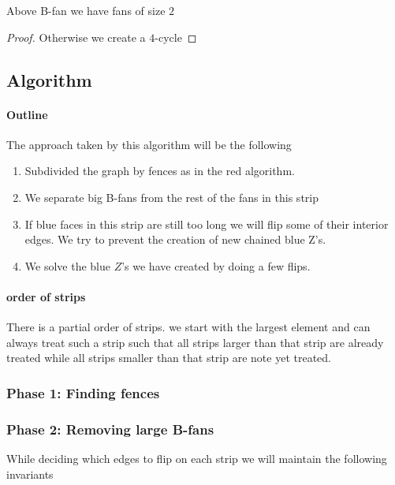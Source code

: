   \begin{lemma}
    \label{lm:}
    Above B-fan we have fans of size $2$
  \end{lemma}
  \begin{proof}
    Otherwise we create a $4$-cycle
  \end{proof}


\subsection{Algorithm}

\paragraph{Outline}
The approach taken by this algorithm will be the following
\begin{enumerate}
  \item Subdivided the graph by fences as in the red algorithm.
  \item We separate big B-fans from the rest of the fans in this strip
  \item If blue faces  in this strip are still too long we will flip some of their interior edges. We try to prevent the creation of new chained blue Z's.
  \item We solve the blue $Z$'s we have created by doing a few flips.
\end{enumerate}

\paragraph{order of strips}
There is a partial order of strips. we start with the largest element and can always treat such a strip such that all strips larger than that strip are already treated while all strips smaller than that strip are note yet treated.




\subsubsection{Phase 1: Finding fences}


\subsubsection{Phase 2: Removing large B-fans}

While deciding which edges to flip on each strip we will maintain the following invariants

